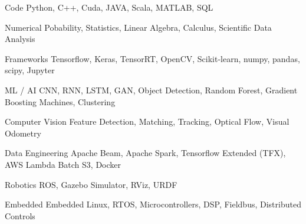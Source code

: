 

\begin{cvskills}

\cvskill
    {Code} %
    {Python, C++, Cuda, JAVA, Scala, MATLAB, SQL} %

\cvskill
    {Numerical} %
    {Pobability, Statistics, Linear Algebra, Calculus, Scientific Data Analysis} %


\cvskill
    {Frameworks} %
    {Tensorflow, Keras, TensorRT, OpenCV, Scikit-learn, numpy, pandas, scipy, Jupyter} %

\cvskill
    {ML / AI} %
    {CNN, RNN, LSTM, GAN, Object Detection, Random Forest, Gradient Boosting Machines, Clustering} %

\cvskill
    {Computer Vision} %
    {Feature Detection, Matching, Tracking, Optical Flow, Visual Odometry} %

\cvskill
    {Data Engineering} %
    {Apache Beam, Apache Spark, Tensorflow Extended (TFX), AWS Lambda Batch S3, Docker} %

\cvskill
    {Robotics} %
    {ROS, Gazebo Simulator, RViz, URDF} %

\cvskill
    {Embedded} %
    {Embedded Linux, RTOS, Microcontrollers, DSP, Fieldbus, Distributed Controls} %

\end{cvskills}